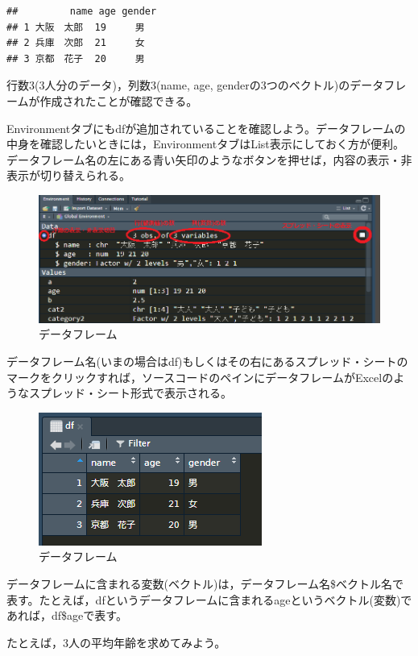 \documentclass[
]{book}
\newenvironment{Shaded}{\begin{snugshade}}{\end{snugshade}}
\newcommand{\FunctionTok}[1]{\textcolor[rgb]{0.00,0.00,0.00}{#1}}
\newcommand{\NormalTok}[1]{#1}
\newcommand{\SpecialCharTok}[1]{\textcolor[rgb]{0.00,0.00,0.00}{#1}}
\begin{document}
\begin{verbatim}
##         name age gender
## 1 大阪　太郎  19     男
## 2 兵庫　次郎  21     女
## 3 京都　花子  20     男
\end{verbatim}

行数3(3人分のデータ)，列数3(name, age, genderの3つのベクトル)のデータフレームが作成されたことが確認できる。

Environmentタブにもdfが追加されていることを確認しよう。データフレームの中身を確認したいときには，EnvironmentタブはList表示にしておく方が便利。データフレーム名の左にある青い矢印のようなボタンを押せば，内容の表示・非表示が切り替えられる。

\begin{figure}
\centering
\includegraphics{df1.png}
\caption{データフレーム}
\end{figure}

データフレーム名(いまの場合はdf)もしくはその右にあるスプレッド・シートのマークをクリックすれば，ソースコードのペインにデータフレームがExcelのようなスプレッド・シート形式で表示される。

\begin{figure}
\centering
\includegraphics{df2.png}
\caption{データフレーム}
\end{figure}

データフレームに含まれる変数(ベクトル)は，データフレーム名\$ベクトル名で表す。たとえば，dfというデータフレームに含まれるageというベクトル(変数)であれば，df\$ageで表す。

たとえば，3人の平均年齢を求めてみよう。

\begin{Shaded}
\end{Shaded}
\end{document}
